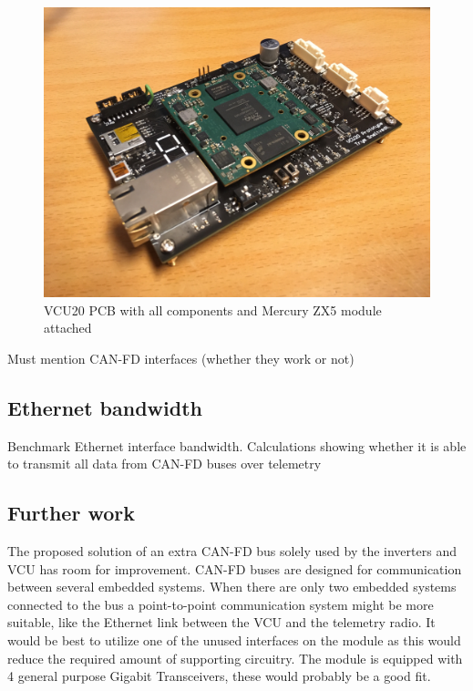 \begin{figure}[h!]
    \centering
    \includegraphics[width=.85\textwidth]{media/vcu20.JPG}
    \caption{VCU20 PCB with all components and Mercury ZX5 module attached}
    \label{fig:vcu20_soldered}
\end{figure}

{\color{red}Must mention CAN-FD interfaces (whether they work or not)}

\subsection{Ethernet bandwidth}

{\color{red} Benchmark Ethernet interface bandwidth. Calculations showing whether it is able to transmit all data from CAN-FD buses over telemetry}

\subsection{Further work}

The proposed solution of an extra CAN-FD bus solely used by the inverters and VCU has room for improvement. CAN-FD buses are designed for communication between several embedded systems. When there are only two embedded systems connected to the bus a point-to-point communication system might be more suitable, like the Ethernet link between the VCU and the telemetry radio. It would be best to utilize one of the unused interfaces on the module as this would reduce the required amount of supporting circuitry. The module is equipped with 4 general purpose Gigabit Transceivers, these would probably be a good fit.

